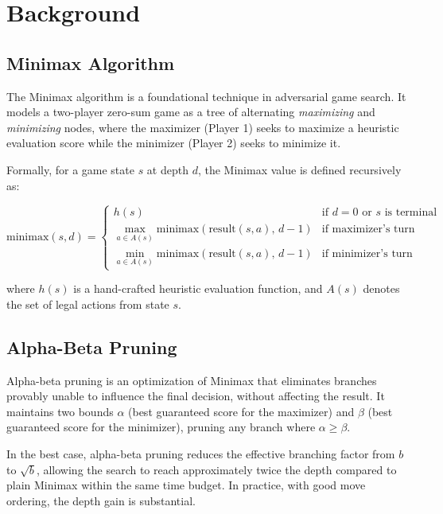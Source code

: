 \section{Background}

\subsection{Minimax Algorithm}

The Minimax algorithm is a foundational technique in adversarial game search. It models a two-player zero-sum game as a tree of alternating \textit{maximizing} and \textit{minimizing} nodes, where the maximizer (Player 1) seeks to maximize a heuristic evaluation score while the minimizer (Player 2) seeks to minimize it.

Formally, for a game state $s$ at depth $d$, the Minimax value is defined recursively as:

\begin{equation}
    \text{minimax}(s, d) =
    \begin{cases}
        h(s) & \text{if } d = 0 \text{ or } s \text{ is terminal} \\
        \max_{a \in A(s)} \text{minimax}(\text{result}(s,a),\, d{-}1) & \text{if maximizer's turn} \\
        \min_{a \in A(s)} \text{minimax}(\text{result}(s,a),\, d{-}1) & \text{if minimizer's turn}
    \end{cases}
\end{equation}

where $h(s)$ is a hand-crafted heuristic evaluation function, and $A(s)$ denotes the set of legal actions from state $s$.

\subsection{Alpha-Beta Pruning}

Alpha-beta pruning is an optimization of Minimax that eliminates branches provably unable to influence the final decision, without affecting the result. It maintains two bounds $\alpha$ (best guaranteed score for the maximizer) and $\beta$ (best guaranteed score for the minimizer), pruning any branch where $\alpha \geq \beta$.

In the best case, alpha-beta pruning reduces the effective branching factor from $b$ to $\sqrt{b}$, allowing the search to reach approximately twice the depth compared to plain Minimax within the same time budget. In practice, with good move ordering, the depth gain is substantial.

